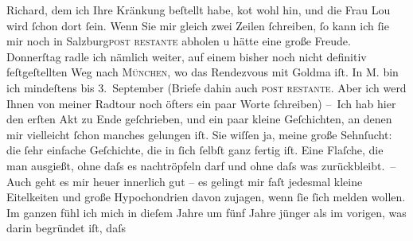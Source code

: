 \begin{ledgroupsized}[t]{13cm}
                  Richard, dem ich Ihre Kränkung beſtellt
               habe, ko{\geminationm}t wohl hin, und die Frau Lou wird ſchon dort ſein. Wenn Sie mir gleich zwei Zeilen
               ſchreiben, ſo kann ich ſie mir noch in Salzburg\textsc{post restante} abholen u hätte eine große Freude.
                  Donnerſtag radle ich nämlich weiter, auf einem bisher noch nicht
               definitiv feſtgeſtellten Weg nach \textsc{München}, wo das Rendezvous mit Goldma{\geminationn} iſt. In M. bin ich mindeſtens bis
                  3. September (Briefe dahin auch \textsc{post
                  restante}. Aber ich {\pb}werd Ihnen von meiner Radtour
               noch öfters ein paar Worte ſchreiben)\pend
           \pstart
           – Ich hab hier den erſten Akt
               zu Ende geſchrieben, und ein paar kleine Geſchichten, an denen mir vielleicht ſchon manches gelungen
               iſt. Sie wiſſen ja, meine große Sehnſucht: die ſehr einfache Geſchichte, die in ſich
               ſelbſt ganz fertig iſt. Eine Flaſche, die man ausgießt, ohne daſs es nachtröpfeln
               darf und ohne daſs was zurückbleibt. – Auch geht es mir heuer innerlich gut – es
               gelingt mir faſt jedesmal kleine Eitelkeiten und große {\pb}Hypochondrien davon zujagen, wenn ſie ſich melden wollen. Im ganzen fühl ich mich
               in dieſem Jahre um fünf Jahre jünger als im vorigen, was darin begründet iſt, daſs

\end{ledgroupsized}
